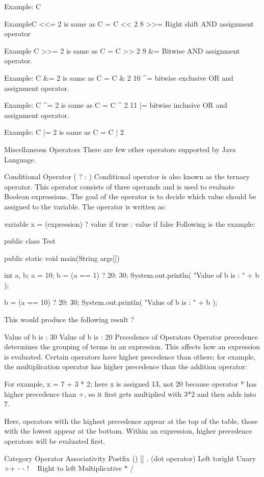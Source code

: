 Example: C %

ExampleC <<= 2 is same as C = C << 2 8 >>= Right shift AND assignment operator

Example C >>= 2 is same as C = C >> 2 9 &= Bitwise AND assignment operator.

Example: C &= 2 is same as C = C & 2 10 ^= bitwise exclusive OR and assignment operator.

Example: C ^= 2 is same as C = C ^ 2 11 |= bitwise inclusive OR and assignment operator.

Example: C |= 2 is same as C = C | 2

Miscellaneous Operators
There are few other operators supported by Java Language.

Conditional Operator ( ? : ) Conditional operator is also known as the ternary operator. This operator consists of three operands and is used to evaluate Boolean expressions. The goal of the operator is to decide which value should be assigned to the variable. The operator is written as:

variable x = (expression) ? value if true : value if false
Following is the example:

public class Test {

   public static void main(String args[]){
      int a, b;
      a = 10;
      b = (a == 1) ? 20: 30;
      System.out.println( "Value of b is : " +  b );

      b = (a == 10) ? 20: 30;
      System.out.println( "Value of b is : " + b );
   }
}
This would produce the following result ?

Value of b is : 30
Value of b is : 20
Precedence of Operators
Operator precedence determines the grouping of terms in an expression. This affects how an expression is evaluated. Certain operators have higher precedence than others; for example, the multiplication operator has higher precedence than the addition operator:

For example, x = 7 + 3 * 2; here x is assigned 13, not 20 because operator * has higher precedence than +, so it first gets multiplied with 3*2 and then adds into 7.

Here, operators with the highest precedence appear at the top of the table, those with the lowest appear at the bottom. Within an expression, higher precedence operators will be evaluated first.

Category Operator Associativity Postfix () [] . (dot operator) Left toright Unary ++ - - ! ~ Right to left Multiplicative * / %

